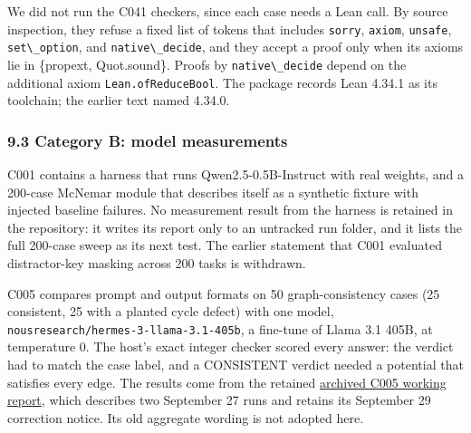 \documentclass[
  11pt,
]{article}
\newcommand{\passthrough}[1]{#1}
\begin{document}
We did not run the C041 checkers, since each case needs a Lean call. By
source inspection, they refuse a fixed list of tokens that includes
\passthrough{\lstinline!sorry!}, \passthrough{\lstinline!axiom!},
\passthrough{\lstinline!unsafe!}, \passthrough{\lstinline!set\_option!},
and \passthrough{\lstinline!native\_decide!}, and they accept a proof
only when its axioms lie in \{propext, Quot.sound\}. Proofs by
\passthrough{\lstinline!native\_decide!} depend on the additional axiom
\passthrough{\lstinline!Lean.ofReduceBool!}. The package records Lean
4.34.1 as its toolchain; the earlier text named 4.34.0.

\hypertarget{category-b-model-measurements}{%
\subsubsection{9.3 Category B: model
measurements}\label{category-b-model-measurements}}

C001 contains a harness that runs Qwen2.5-0.5B-Instruct with real
weights, and a 200-case McNemar module that describes itself as a
synthetic fixture with injected baseline failures. No measurement result
from the harness is retained in the repository: it writes its report
only to an untracked run folder, and it lists the full 200-case sweep as
its next test. The earlier statement that C001 evaluated distractor-key
masking across 200 tasks is withdrawn.

C005 compares prompt and output formats on 50 graph-consistency cases
(25 consistent, 25 with a planted cycle defect) with one model,
\nolinkurl{nousresearch/hermes-3-llama-3.1-405b}, a fine-tune of Llama
3.1 405B, at temperature 0. The host's exact integer checker scored
every answer: the verdict had to match the case label, and a CONSISTENT
verdict needed a potential that satisfies every edge. The results come
from the retained
\href{https://github.com/dbccpage/the_symbol_game/blob/main/education/documentation/030_pfp_proposal_fidelity_protocol_pfp/papers/symbol_game/008_pfp_mssn_tower_challenges_and_retraction_benchmarks/docs/source_archive/c005_working_report.md}{archived
C005 working report}, which describes two September 27 runs and retains
its September 29 correction notice. Its old aggregate wording is not
adopted here.
\end{document}
